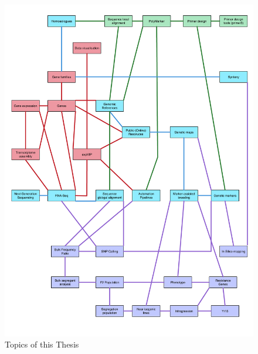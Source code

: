\begin{figure}
\centering
\includegraphics[width=1\textwidth]{Introduction/RicardoThesisTopics.pdf}
\caption{Topics of this Thesis}
\end{figure}